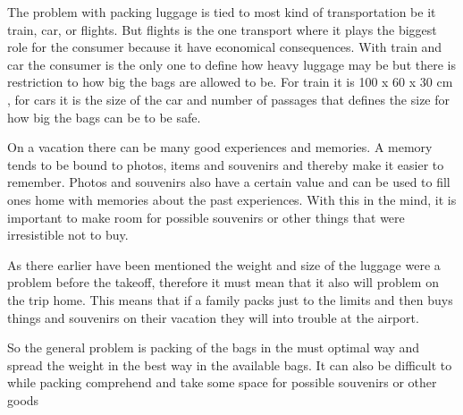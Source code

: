 The problem with packing luggage is tied to most kind of transportation be it train, car, or flights. But flights is the one transport where it plays the biggest role for the consumer because it have economical consequences. With train and car the consumer is the only one to define how heavy luggage may be but there is restriction to how big the bags are allowed to be. For train it is 100 x 60 x 30 cm \citep{rulestrain}, for cars it is the size of the car and number of passages that defines the size for how big the bags can be to be safe.

On a vacation there can be many good experiences and memories. A memory tends to be bound to photos, items and souvenirs and thereby make it easier to remember. Photos and souvenirs also have a certain value and can be used to fill ones home with memories about the past experiences.
With this in the mind, it is important to make room for possible souvenirs or other things that were irresistible not to buy.

As there earlier have been mentioned the weight and size of the luggage were a problem before the takeoff, therefore it must mean that it also will problem on the trip home.
This means that if a family packs just to the limits and then buys things and souvenirs on their vacation they will into trouble at the airport.

So the general problem is packing of the bags in the must optimal way and spread the weight in the best way in the available bags. It can also be difficult to while packing comprehend and take some space for possible souvenirs or other goods
